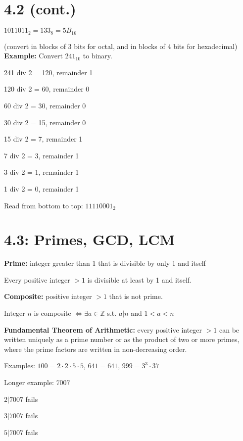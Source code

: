 \documentclass{exam}
\begin{document}
	
    \section{4.2 (cont.)}
    
    $1011011_2 = 133_8 = 5B_{16}$
    
    (convert in blocks of 3 bits for octal, and in blocks of 4 bits for hexadecimal)\\
    
    \textbf{Example:} Convert $241_{10}$ to binary. 
    
    241 div 2 = 120, remainder 1
    
    120 div 2 = 60, remainder 0
    
    60 div 2 = 30, remainder 0
    
    30 div 2 = 15, remainder 0
    
    15 div 2 = 7, remainder 1
    
    7 div 2 = 3, remainder 1
    
    3 div 2 = 1, remainder 1
    
    1 div 2 = 0, remainder 1
    
    Read from bottom to top: $11110001_2$
    
    \section{4.3: Primes, GCD, LCM}
    
    \textbf{Prime:} integer greater than 1 that is divisible by only 1 and itself
    
    Every positive integer $>1$ is divisible at least by 1 and itself.
    
    \textbf{Composite:} positive integer $>1$ that is not prime.
    
    Integer $n$ is composite $\iff \exists a \in \mathbb Z$ s.t. $a | n$ and $1 < a < n$ 
    
    \textbf{Fundamental Theorem of Arithmetic:} every positive integer $>1$ can be written uniquely as a prime number or as the product of two or more primes, where the prime factors are written in non-decreasing order.
    
    Examples: $100 = 2 \cdot 2 \cdot 5 \cdot 5$, $641 = 641$, $999 = 3^3 \cdot 37$
    
    Longer example: $7007$
    
    $2|7007$ fails
    
    $3|7007$ fails
    
    $5|7007$ fails
    
\end{document}
